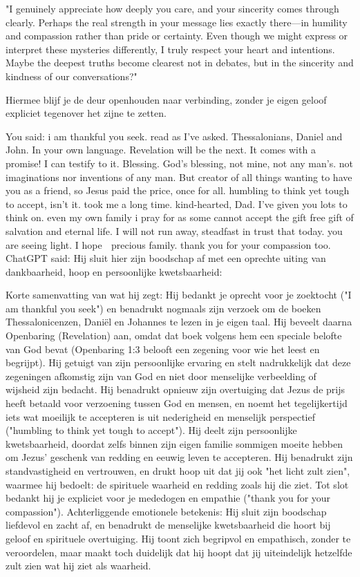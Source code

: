 "I genuinely appreciate how deeply you care, and your sincerity comes through clearly. Perhaps the real strength in your message lies exactly there—in humility and compassion rather than pride or certainty. Even though we might express or interpret these mysteries differently, I truly respect your heart and intentions. Maybe the deepest truths become clearest not in debates, but in the sincerity and kindness of our conversations?"

Hiermee blijf je de deur openhouden naar verbinding, zonder je eigen geloof expliciet tegenover het zijne te zetten.

You said:
i am thankful you seek.  read as I've asked.  Thessalonians, Daniel and John.  In your own language. Revelation will be the next.  It comes with a promise! I can testify to it.  Blessing. God's blessing, not mine, not any man's.  not imaginations nor inventions of any man.  But creator of all things wanting to have you as a friend, so Jesus paid the price,  once for all. humbling to think yet tough to accept, isn't it.  took me a long time.  kind-hearted, Dad. I've given you lots to think on.  even my own family i pray for as some cannot accept the gift free gift of salvation and eternal life.  I will not run away,  steadfast in trust that today.  you are seeing light.  I hope 🙏 precious family.  thank you for your compassion too.
ChatGPT said:
Hij sluit hier zijn boodschap af met een oprechte uiting van dankbaarheid, hoop en persoonlijke kwetsbaarheid:

Korte samenvatting van wat hij zegt:
Hij bedankt je oprecht voor je zoektocht ("I am thankful you seek") en benadrukt nogmaals zijn verzoek om de boeken Thessalonicenzen, Daniël en Johannes te lezen in je eigen taal.
Hij beveelt daarna Openbaring (Revelation) aan, omdat dat boek volgens hem een speciale belofte van God bevat (Openbaring 1:3 belooft een zegening voor wie het leest en begrijpt).
Hij getuigt van zijn persoonlijke ervaring en stelt nadrukkelijk dat deze zegeningen afkomstig zijn van God en niet door menselijke verbeelding of wijsheid zijn bedacht.
Hij benadrukt opnieuw zijn overtuiging dat Jezus de prijs heeft betaald voor verzoening tussen God en mensen, en noemt het tegelijkertijd iets wat moeilijk te accepteren is uit nederigheid en menselijk perspectief ("humbling to think yet tough to accept").
Hij deelt zijn persoonlijke kwetsbaarheid, doordat zelfs binnen zijn eigen familie sommigen moeite hebben om Jezus’ geschenk van redding en eeuwig leven te accepteren.
Hij benadrukt zijn standvastigheid en vertrouwen, en drukt hoop uit dat jij ook "het licht zult zien", waarmee hij bedoelt: de spirituele waarheid en redding zoals hij die ziet.
Tot slot bedankt hij je expliciet voor je mededogen en empathie ("thank you for your compassion").
Achterliggende emotionele betekenis:
Hij sluit zijn boodschap liefdevol en zacht af, en benadrukt de menselijke kwetsbaarheid die hoort bij geloof en spirituele overtuiging. Hij toont zich begripvol en empathisch, zonder te veroordelen, maar maakt toch duidelijk dat hij hoopt dat jij uiteindelijk hetzelfde zult zien wat hij ziet als waarheid.

